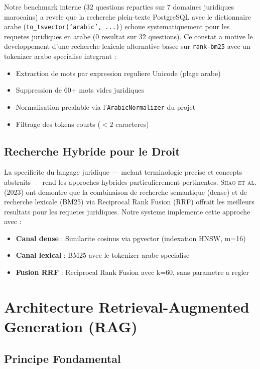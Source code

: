 Notre benchmark interne (32 questions reparties sur 7 domaines juridiques marocains) a revele que la recherche plein-texte PostgreSQL avec le dictionnaire arabe (\texttt{to\_tsvector(`arabic', ...)}) echoue systematiquement pour les requetes juridiques en arabe (0 resultat sur 32 questions). Ce constat a motive le developpement d'une recherche lexicale alternative basee sur \texttt{rank-bm25} avec un tokenizer arabe specialise integrant :

\begin{itemize}
    \item Extraction de mots par expression reguliere Unicode (plage arabe)
    \item Suppression de 60+ mots vides juridiques
    \item Normalisation prealable via l'\texttt{ArabicNormalizer} du projet
    \item Filtrage des tokens courts ($< 2$ caracteres)
\end{itemize}

\subsection{Recherche Hybride pour le Droit}

La specificite du langage juridique --- melant terminologie precise et concepts abstraits --- rend les approches hybrides particulierement pertinentes. \textsc{Shao et al.} (2023) ont demontre que la combinaison de recherche semantique (dense) et de recherche lexicale (BM25) via Reciprocal Rank Fusion (RRF) offrait les meilleurs resultats pour les requetes juridiques. Notre systeme implemente cette approche avec :

\begin{itemize}
    \item \textbf{Canal dense} : Similarite cosinus via pgvector (indexation HNSW, m=16)
    \item \textbf{Canal lexical} : BM25 avec le tokenizer arabe specialise
    \item \textbf{Fusion RRF} : Reciprocal Rank Fusion avec k=60, sans parametre a regler
\end{itemize}

\section{Architecture Retrieval-Augmented Generation (RAG)}

\subsection{Principe Fondamental}

